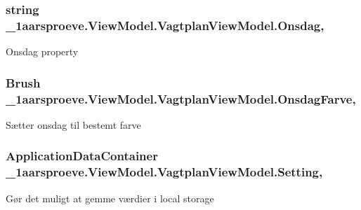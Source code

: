 \subsubsection[{Onsdag}]{\setlength{\rightskip}{0pt plus 5cm}string \+\_\+1aarsproeve.\+View\+Model.\+Vagtplan\+View\+Model.\+Onsdag\hspace{0.3cm}{\ttfamily [get]}, {\ttfamily [set]}}\label{class__1aarsproeve_1_1_view_model_1_1_vagtplan_view_model_a4d544dfd8109650066d5e9d25642c352}


Onsdag property 

\hypertarget{class__1aarsproeve_1_1_view_model_1_1_vagtplan_view_model_a3c463aaf64f3e35e910640a29969943d}{}
\subsubsection[{Onsdag\+Farve}]{\setlength{\rightskip}{0pt plus 5cm}Brush \+\_\+1aarsproeve.\+View\+Model.\+Vagtplan\+View\+Model.\+Onsdag\+Farve\hspace{0.3cm}{\ttfamily [get]}, {\ttfamily [set]}}\label{class__1aarsproeve_1_1_view_model_1_1_vagtplan_view_model_a3c463aaf64f3e35e910640a29969943d}


Sætter onsdag til bestemt farve 

\hypertarget{class__1aarsproeve_1_1_view_model_1_1_vagtplan_view_model_aa5e675ea6389cdc802698037ced2e091}{}
\subsubsection[{Setting}]{\setlength{\rightskip}{0pt plus 5cm}Application\+Data\+Container \+\_\+1aarsproeve.\+View\+Model.\+Vagtplan\+View\+Model.\+Setting\hspace{0.3cm}{\ttfamily [get]}, {\ttfamily [set]}}\label{class__1aarsproeve_1_1_view_model_1_1_vagtplan_view_model_aa5e675ea6389cdc802698037ced2e091}


Gør det muligt at gemme værdier i local storage 

